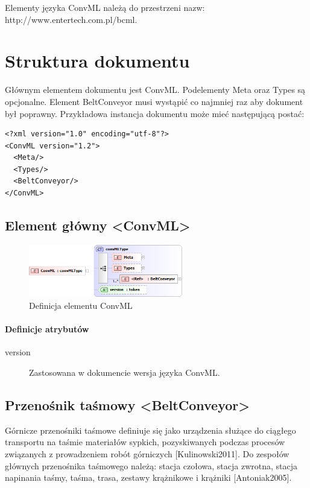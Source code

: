 \documentclass[12pt,a4paper]{article}
\begin{document}
Elementy języka ConvML należą do przestrzeni nazw:
http://www.entertech.com.pl/bcml.


\section{Struktura dokumentu}
Głównym elementem dokumentu jest ConvML.  Podelementy Meta oraz Types są
opcjonalne. Element BeltConveyor musi wystąpić co najmniej raz aby dokument był
poprawny.  Przykładowa instancja dokumentu może mieć następującą postać:

\begin{verbatim}
<?xml version="1.0" encoding="utf-8"?>
<ConvML version="1.2">
  <Meta/>
  <Types/>
  <BeltConveyor/>
</ConvML>
\end{verbatim}  


\subsection{Element główny <ConvML>}

\begin{figure}[H]
  \centering
  \includegraphics[width=0.6\textwidth]{png/convml_xsd2}
  \caption{Definicja elementu ConvML}
  \label{fig:convml-xsd}
\end{figure}

\paragraph{Definicje atrybutów}
\begin{description}
\item[version] Zastosowana w dokumencie wersja języka ConvML.
\end{description}


\subsection{Przenośnik taśmowy <BeltConveyor>}
Górnicze przenośniki taśmowe definiuje się jako urządzenia służące do ciągłego
transportu na taśmie materiałów sypkich, pozyskiwanych podczas procesów
związanych z prowadzeniem robót górniczych [Kulinowski2011].  Do zespołów
głównych przenośnika taśmowego należą: stacja czołowa, stacja zwrotna, stacja
napinania taśmy, taśma, trasa, zestawy krążnikowe i krążniki [Antoniak2005].
\end{document}
